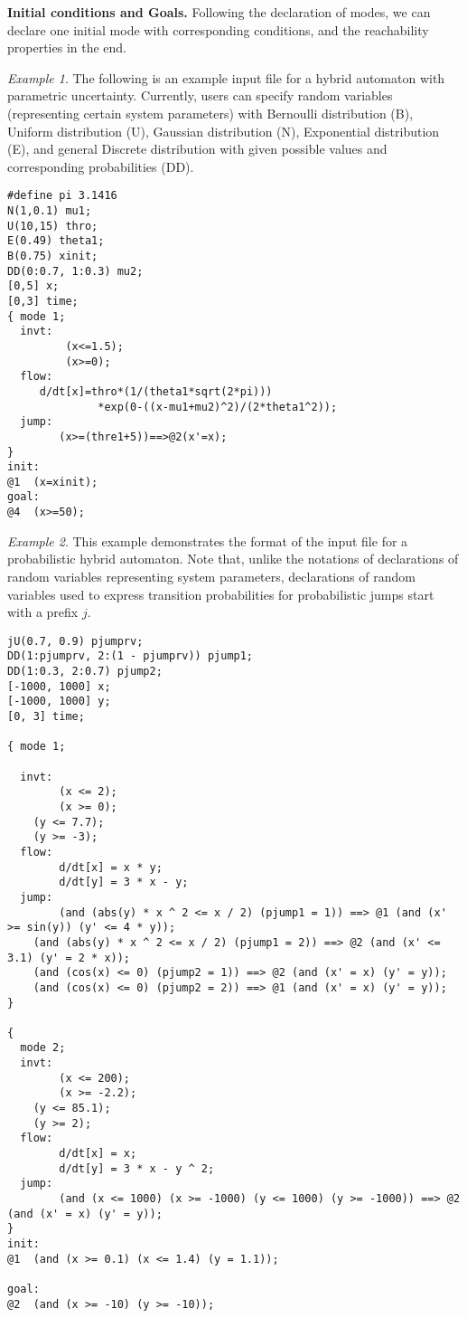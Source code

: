 {\bf Initial conditions and Goals.} Following the declaration of modes, we can declare one initial mode with corresponding conditions, and the reachability properties in the end.

\noindent\textit{Example 1}. The following is an example input file for a hybrid automaton with parametric uncertainty. Currently, users can specify random variables (representing certain system parameters) with Bernoulli distribution (B), Uniform distribution (U), Gaussian distribution (N), Exponential distribution (E), and general Discrete distribution with given possible values and corresponding probabilities (DD). 
\lstset{basicstyle=\ttfamily\small, numbers=left, breaklines=true }
\begin{lstlisting}
#define pi 3.1416
N(1,0.1) mu1;
U(10,15) thro;
E(0.49) theta1;
B(0.75) xinit;
DD(0:0.7, 1:0.3) mu2;
[0,5] x;
[0,3] time;
{ mode 1; 
  invt:
         (x<=1.5);
         (x>=0);
  flow:
	 d/dt[x]=thro*(1/(theta1*sqrt(2*pi)))
	          *exp(0-((x-mu1+mu2)^2)/(2*theta1^2));
  jump:
        (x>=(thre1+5))==>@2(x'=x);
}
init:
@1	(x=xinit);
goal:
@4	(x>=50);
\end{lstlisting}

\noindent\textit{Example 2}.  This example demonstrates the format of the input file for a probabilistic hybrid automaton. Note that, unlike the notations of declarations of random variables representing system parameters, declarations of random variables used to express transition probabilities for probabilistic jumps start with a prefix $j$.
\lstset{basicstyle=\ttfamily\small, numbers=left, breaklines=true }
\begin{lstlisting}
jU(0.7, 0.9) pjumprv;
DD(1:pjumprv, 2:(1 - pjumprv)) pjump1;
DD(1:0.3, 2:0.7) pjump2;
[-1000, 1000] x;
[-1000, 1000] y;
[0, 3] time;

{ mode 1;

  invt:
        (x <= 2);
        (x >= 0);
	(y <= 7.7);
	(y >= -3);
  flow:
        d/dt[x] = x * y;
        d/dt[y] = 3 * x - y;
  jump:
        (and (abs(y) * x ^ 2 <= x / 2) (pjump1 = 1)) ==> @1 (and (x' >= sin(y)) (y' <= 4 * y));
	(and (abs(y) * x ^ 2 <= x / 2) (pjump1 = 2)) ==> @2 (and (x' <= 3.1) (y' = 2 * x));
	(and (cos(x) <= 0) (pjump2 = 1)) ==> @2 (and (x' = x) (y' = y));
	(and (cos(x) <= 0) (pjump2 = 2)) ==> @1 (and (x' = x) (y' = y));
}

{
  mode 2;
  invt:
        (x <= 200);
        (x >= -2.2);
	(y <= 85.1);
	(y >= 2);
  flow:
        d/dt[x] = x;
        d/dt[y] = 3 * x - y ^ 2;
  jump:
        (and (x <= 1000) (x >= -1000) (y <= 1000) (y >= -1000)) ==> @2 (and (x' = x) (y' = y));
}
init:
@1	(and (x >= 0.1) (x <= 1.4) (y = 1.1));

goal:
@2	(and (x >= -10) (y >= -10));
\end{lstlisting}


